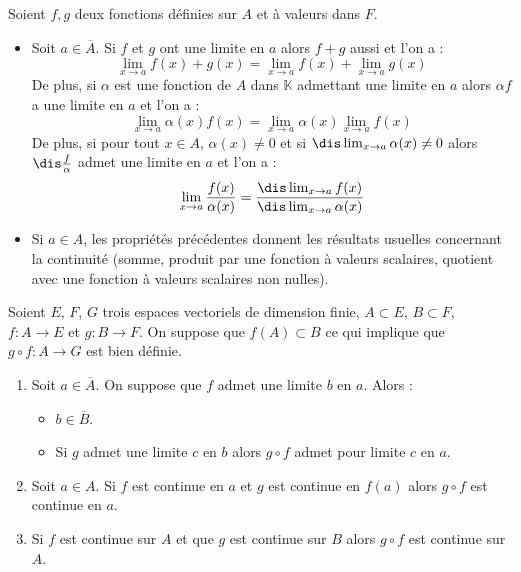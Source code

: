 \documentclass[a4paper,10pt]{report}
\begin{document}
\begin{prop} Soient $f,g$ deux fonctions définies sur $A$ et à valeurs dans $F$.

\begin{itemize}
\item Soit $a \in \overline{A}$. Si $f$ et $g$ ont une limite en $a$ alors $f+g$ aussi et l'on a :
$$ \lim_{x \rightarrow a} f(x)+g(x) = \lim_{x \rightarrow a} f(x) +  \lim_{x \rightarrow a} g(x)$$
De plus, si $\alpha$ est une fonction de $A$ dans $\mathbb{K}$ admettant une limite en $a$ alors $\alpha f$ a une limite en $a$ et l'on a :
$$  \lim_{x \rightarrow a} \alpha(x) f(x) =  \lim_{x \rightarrow a} \alpha(x)  \lim_{x \rightarrow a} f(x)$$
De plus, si pour tout $x \in A$, $\alpha(x) \neq 0$ et si $\dis \lim_{x \rightarrow a} \alpha(x) \neq 0$ alors $\dis \frac{f}{\alpha}$ admet une limite en $a$ et l'on a :
$$ \lim_{x \rightarrow a} \frac{f(x)}{\alpha(x)} = \frac{ \dis \lim_{x \rightarrow a} f(x)}{ \dis \lim_{x \rightarrow a} \alpha(x)}$$
\item Si $a \in A$, les propriétés précédentes donnent les résultats usuelles concernant la continuité (somme, produit par une fonction à valeurs scalaires, quotient avec une fonction à valeurs scalaires non nulles). 
\end{itemize}
\end{prop}

\begin{prop}[admis]
Soient $E$, $F$, $G$ trois espaces vectoriels de dimension finie, $A \subset E$, $B \subset F$, $f : A \rightarrow E$ et $g : B \rightarrow F$. On suppose que $f(A) \subset B$ ce qui implique que $g \circ f : A \rightarrow G$ est bien définie.

\begin{enumerate}
\item Soit $a \in \overline{A}$. On suppose que $f$ admet une limite $b$ en $a$. Alors :
\begin{itemize}
\item $b \in \overline{B}$.
\item Si $g$ admet une limite $c$ en $b$ alors $g \circ f$ admet pour limite $c$ en $a$.
\end{itemize}
\item Soit $a \in A$. Si $f$ est continue en $a$ et $g$ est continue en $f(a)$ alors $g \circ f$ est continue en $a$.
\item Si $f$ est continue sur $A$ et que $g$ est continue sur $B$ alors $g \circ f$ est continue sur $A$.
\end{enumerate}
\end{prop}
\end{document}
